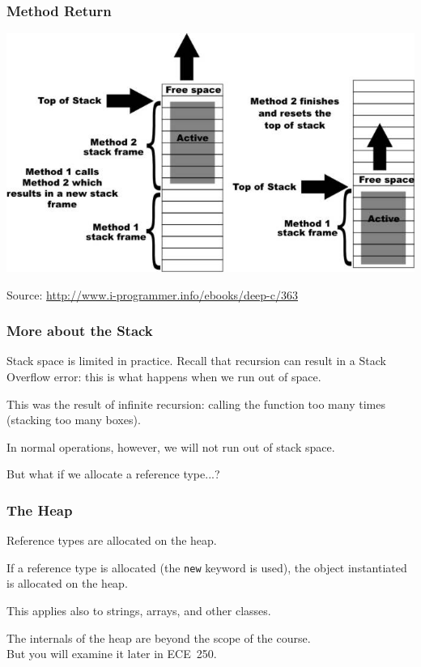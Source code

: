 \begin{frame}
\frametitle{Method Return}

\begin{center}
	\includegraphics[width=\textwidth]{images/stackframes.jpg}
\end{center}
Source: \url{http://www.i-programmer.info/ebooks/deep-c/363}
\end{frame}


\begin{frame}
\frametitle{More about the Stack}

Stack space is limited in practice. Recall that recursion can result in a Stack Overflow error: this is what happens when we run out of space.

This was the result of infinite recursion: calling the function too many times (stacking too many boxes).

In normal operations, however, we will not run out of stack space.

But what if we allocate a reference type...?

\end{frame}

\begin{frame}
\frametitle{The Heap}

Reference types are allocated on the heap.

If a reference type is allocated (the \texttt{new} keyword is used), the object instantiated is allocated on the heap.

This applies also to strings, arrays, and other classes.

The internals of the heap are beyond the scope of the course.\\
\quad But you will examine it later in ECE~250.

\end{frame}

